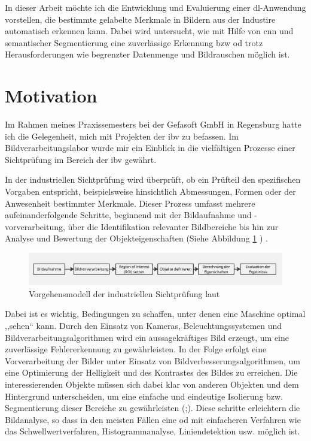 In dieser Arbeit möchte ich die Entwicklung und Evaluierung einer \gls{dl}-Anwendung vorstellen, die bestimmte gelabelte Merkmale in Bildern aus der Industire automatisch erkennen kann. Dabei wird untersucht, wie mit Hilfe von \gls{cnn} und semantischer Segmentierung eine zuverlässige Erkennung bzw \gls{od} trotz Herausforderungen wie begrenzter Datenmenge und Bildrauschen möglich ist.

\section{Motivation}\label{expose_motivation}
Im Rahmen meines Praxissemesters bei der Gefasoft GmbH in Regensburg hatte ich die Gelegenheit, mich mit Projekten der \gls{ibv} zu befassen. Im Bildverarbeitungslabor wurde mir ein Einblick in die vielfältigen Prozesse einer Sichtprüfung im Bereich der \gls{ibv} gewährt.

In der industriellen Sichtprüfung wird überprüft, ob ein Prüfteil den spezifischen Vorgaben entspricht, beispielsweise hinsichtlich Abmessungen, Formen oder der Anwesenheit bestimmter Merkmale. Dieser Prozess umfasst mehrere aufeinanderfolgende Schritte, beginnend mit der Bildaufnahme und -vorverarbeitung, über die Identifikation relevanter Bildbereiche bis hin zur Analyse und Bewertung der Objekteigenschaften (Siehe Abbildung \ref{fig:vorgehensmodell} ) \cite[S. 15–16]{demant_industrielle_2011}.

\begin{figure}[h]
    \centering
    \includegraphics[width=1\linewidth]{expose/Vorgehensmodell_IBV.jpg}
    \caption{Vorgehensmodell der industriellen Sichtprüfung laut \cite[S.15]{demant_industrielle_2011}}
    \label{fig:vorgehensmodell}
\end{figure}

Dabei ist es wichtig, Bedingungen zu schaffen, unter denen eine Maschine optimal ,,sehen`` kann. Durch den Einsatz von Kameras, Beleuchtungssystemen und Bildverarbeitungsalgorithmen wird ein aussagekräftiges Bild erzeugt, um eine zuverlässige Fehlererkennung zu gewährleisten. In der Folge erfolgt eine Vorverarbeitung der Bilder unter Einsatz von Bildverbesserungsalgorithmen, um eine Optimierung der Helligkeit und des Kontrastes des Bildes zu erreichen. Die interessierenden Objekte müssen sich dabei klar von anderen Objekten und dem Hintergrund unterscheiden, um eine einfache und eindeutige Isolierung bzw. Segmentierung dieser Bereiche zu gewährleisten (\citealp[S.16]{demant_industrielle_2011};\citealp[S. 211,589]{suse_bildverarbeitung_2014}). Diese schritte erleichtern die Bildanalyse, so dass in den meisten Fällen eine \gls{od} mit einfacheren Verfahren wie das Schwellwertverfahren, Histogrammanalyse, Liniendetektion usw. möglich ist.

